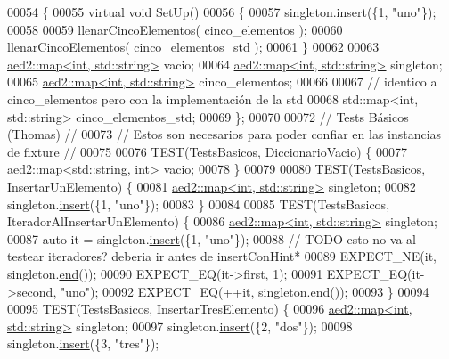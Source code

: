 \begin{DoxyCode}
00054 \{
00055     \textcolor{keyword}{virtual} \textcolor{keywordtype}{void} SetUp()
00056     \{
00057         singleton.insert(\{1, \textcolor{stringliteral}{"uno"}\});
00058 
00059         llenarCincoElementos( cinco\_elementos );
00060         llenarCincoElementos( cinco\_elementos\_std );
00061     \}
00062 
00063     \hyperlink{classaed2_1_1map}{aed2::map<int, std::string>} vacio;
00064     \hyperlink{classaed2_1_1map}{aed2::map<int, std::string>} singleton;
00065     \hyperlink{classaed2_1_1map}{aed2::map<int, std::string>} cinco\_elementos;
00066 
00067     \textcolor{comment}{// identico a cinco\_elementos pero con la implementación de la std}
00068     std::map<int, std::string> cinco\_elementos\_std;
00069 \};
00070 
00072 \textcolor{comment}{// Tests Básicos (Thomas)                                               //}
00073 \textcolor{comment}{// Estos son necesarios para poder confiar en las instancias de fixture //}
00075 \textcolor{comment}{}
00076 TEST(TestsBasicos, DiccionarioVacio) \{
00077     \hyperlink{classaed2_1_1map}{aed2::map<std::string, int>} vacio;
00078 \}
00079 
00080 TEST(TestsBasicos, InsertarUnElemento) \{
00081     \hyperlink{classaed2_1_1map}{aed2::map<int, std::string>} singleton;
00082     singleton.\hyperlink{classaed2_1_1map_a6941cde9a79c27f054b5c97a587a1854_a6941cde9a79c27f054b5c97a587a1854}{insert}(\{1, \textcolor{stringliteral}{"uno"}\});
00083 \}
00084 
00085 TEST(TestsBasicos, IteradorAlInsertarUnElemento) \{
00086     \hyperlink{classaed2_1_1map}{aed2::map<int, std::string>} singleton;
00087     \textcolor{keyword}{auto} it = singleton.\hyperlink{classaed2_1_1map_a6941cde9a79c27f054b5c97a587a1854_a6941cde9a79c27f054b5c97a587a1854}{insert}(\{1, \textcolor{stringliteral}{"uno"}\});
00088     \textcolor{comment}{// TODO esto no va al testear iteradores? deberia ir antes de insertConHint*}
00089     EXPECT\_NE(it, singleton.\hyperlink{classaed2_1_1map_a76023e6a56cb625513e1b5ea028bf983_a76023e6a56cb625513e1b5ea028bf983}{end}());
00090     EXPECT\_EQ(it->first, 1);
00091     EXPECT\_EQ(it->second, \textcolor{stringliteral}{"uno"});
00092     EXPECT\_EQ(++it, singleton.\hyperlink{classaed2_1_1map_a76023e6a56cb625513e1b5ea028bf983_a76023e6a56cb625513e1b5ea028bf983}{end}());
00093 \}
00094 
00095 TEST(TestsBasicos, InsertarTresElemento) \{
00096     \hyperlink{classaed2_1_1map}{aed2::map<int, std::string>} singleton;
00097     singleton.\hyperlink{classaed2_1_1map_a6941cde9a79c27f054b5c97a587a1854_a6941cde9a79c27f054b5c97a587a1854}{insert}(\{2, \textcolor{stringliteral}{"dos"}\});
00098     singleton.\hyperlink{classaed2_1_1map_a6941cde9a79c27f054b5c97a587a1854_a6941cde9a79c27f054b5c97a587a1854}{insert}(\{3, \textcolor{stringliteral}{"tres"}\});

\end{DoxyCode}
